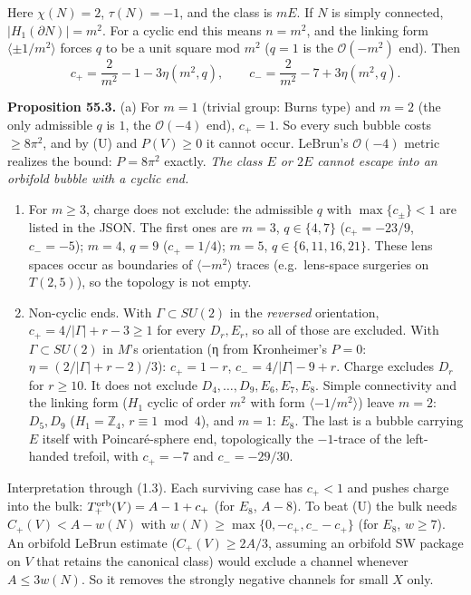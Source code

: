 \documentclass[
  10pt,
]{report}
\begin{document}
Here \(\chi(N)=2\), \(\tau(N)=-1\), and the class is \(mE\). If \(N\) is
simply connected, \(|H_1(\partial N)|=m^2\). For a cyclic end this means
\(n=m^2\), and the linking form \(\langle\pm1/m^2\rangle\) forces \(q\)
to be a unit square mod \(m^2\) (\(q=1\) is the \(\mathcal O(-m^2)\)
end). Then \[
c_+=\frac{2}{m^2}-1-3\eta(m^2,q),\qquad c_-=\frac{2}{m^2}-7+3\eta(m^2,q).
\]

\textbf{Proposition 55.3.} (a) For \(m=1\) (trivial group: Burns type)
and \(m=2\) (the only admissible \(q\) is \(1\), the \(\mathcal O(-4)\)
end), \(c_+=1\). So every such bubble costs \(\ge8\pi^2\), and by (U)
and \(P(V)\ge0\) it cannot occur. LeBrun's \(\mathcal O(-4)\) metric
realizes the bound: \(P=8\pi^2\) exactly. \emph{The class \(E\) or
\(2E\) cannot escape into an orbifold bubble with a cyclic end.}

\begin{enumerate}
\def\labelenumi{(\alph{enumi})}
\setcounter{enumi}{1}
\item
  For \(m\ge3\), charge does not exclude: the admissible \(q\) with
  \(\max\{c_\pm\}<1\) are listed in the JSON. The first ones are
  \(m=3\), \(q\in\{4,7\}\) (\(c_+=-23/9\), \(c_-=-5\)); \(m=4\), \(q=9\)
  (\(c_+=1/4\)); \(m=5\), \(q\in\{6,11,16,21\}\). These lens spaces
  occur as boundaries of \(\langle-m^2\rangle\) traces (e.g.~lens-space
  surgeries on \(T(2,5)\)), so the topology is not empty.
\item
  Non-cyclic ends. With \(\Gamma\subset SU(2)\) in the \emph{reversed}
  orientation, \(c_+=4/|\Gamma|+r-3\ge1\) for every \(D_r,E_r\), so all
  of those are excluded. With \(\Gamma\subset SU(2)\) in \(M\)'s
  orientation (η from Kronheimer's \(P=0\):
  \(\eta=(2/|\Gamma|+r-2)/3\)): \(c_+=1-r\), \(c_-=4/|\Gamma|-9+r\).
  Charge excludes \(D_r\) for \(r\ge10\). It does not exclude
  \(D_4,\dots,D_9,E_6,E_7,E_8\). Simple connectivity and the linking
  form (\(H_1\) cyclic of order \(m^2\) with form
  \(\langle-1/m^2\rangle\)) leave \(m=2\): \(D_5,D_9\)
  (\(H_1=\mathbb Z_4\), \(r\equiv1\bmod4\)), and \(m=1\): \(E_8\). The
  last is a bubble carrying \(E\) itself with Poincaré-sphere end,
  topologically the \(-1\)-trace of the left-handed trefoil, with
  \(c_+=-7\) and \(c_-=-29/30\).
\end{enumerate}

Interpretation through (1.3). Each surviving case has \(c_+<1\) and
pushes charge into the bulk: \(T_+^{\rm orb}(V)=A-1+c_+\) (for \(E_8\),
\(A-8\)). To beat (U) the bulk needs \(C_+(V)<A-w(N)\) with
\(w(N)\ge\max\{0,-c_+,c_--c_+\}\) (for \(E_8\), \(w\ge7\)). An orbifold
LeBrun estimate (\(C_+(V)\ge2A/3\), assuming an orbifold SW package on
\(V\) that retains the canonical class) would exclude a channel whenever
\(A\le3w(N)\). So it removes the strongly negative channels for small
\(X\) only.
\end{document}

